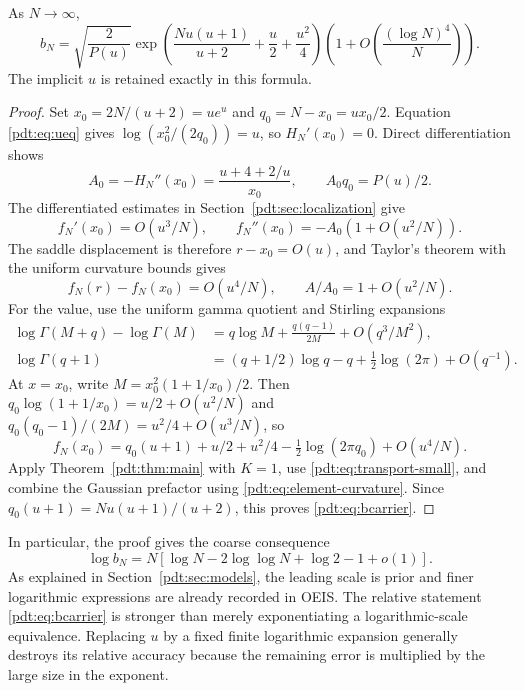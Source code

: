 \begin{theorem}\label{pdt:thm:elementary}
As $N\to\infty$,
\begin{equation}\label{pdt:eq:bcarrier}
 b_N=\sqrt{\frac2{P(u)}}
 \exp\!\left(\frac{Nu(u+1)}{u+2}+\frac u2+\frac{u^2}4\right)
 \left(1+O\!\left(\frac{(\log N)^4}{N}\right)\right).
\end{equation}
The implicit $u$ is retained exactly in this formula.
\end{theorem}
\begin{proof}
Set $x_0=2N/(u+2)=ue^u$ and $q_0=N-x_0=ux_0/2$. Equation \eqref{pdt:eq:ueq} gives
$\log(x_0^2/(2q_0))=u$, so $H_N'(x_0)=0$. Direct differentiation shows
\begin{equation}\label{pdt:eq:element-curvature}
 A_0=-H_N''(x_0)=\frac{u+4+2/u}{x_0},\qquad A_0q_0=P(u)/2.
\end{equation}
The differentiated estimates in Section~\ref{pdt:sec:localization} give
\[
 f_N'(x_0)=O(u^3/N),\qquad
 f_N''(x_0)=-A_0(1+O(u^2/N)).
\]
The saddle displacement is therefore $r-x_0=O(u)$, and Taylor's theorem with the uniform curvature bounds gives
\begin{equation}\label{pdt:eq:transport-small}
 f_N(r)-f_N(x_0)=O(u^4/N),\qquad A/A_0=1+O(u^2/N).
\end{equation}
For the value, use the uniform gamma quotient and Stirling expansions
\begin{align*}
 \log\Gamma(M+q)-\log\Gamma(M)
    &=q\log M+\frac{q(q-1)}{2M}+O(q^3/M^2),\\
 \log\Gamma(q+1)&=(q+1/2)\log q-q+\tfrac12\log(2\pi)+O(q^{-1}).
\end{align*}
At $x=x_0$, write $M=x_0^2(1+1/x_0)/2$. Then
$q_0\log(1+1/x_0)=u/2+O(u^2/N)$ and
$q_0(q_0-1)/(2M)=u^2/4+O(u^3/N)$, so
\[
 f_N(x_0)=q_0(u+1)+u/2+u^2/4
                -\tfrac12\log(2\pi q_0)+O(u^4/N).
\]
Apply Theorem~\ref{pdt:thm:main} with $K=1$, use \eqref{pdt:eq:transport-small}, and combine the Gaussian prefactor using \eqref{pdt:eq:element-curvature}. Since $q_0(u+1)=Nu(u+1)/(u+2)$, this proves \eqref{pdt:eq:bcarrier}.
\end{proof}
In particular, the proof gives the coarse consequence
\begin{equation}\label{pdt:eq:loggrowth}
 \log b_N=N[\log N-2\log\log N+\log2-1+o(1)].
\end{equation}
As explained in Section~\ref{pdt:sec:models}, the leading scale is prior and finer logarithmic expressions are already recorded in OEIS. The relative statement \eqref{pdt:eq:bcarrier} is stronger than merely exponentiating a logarithmic-scale equivalence. Replacing $u$ by a fixed finite logarithmic expansion generally destroys its relative accuracy because the remaining error is multiplied by the large size in the exponent.
